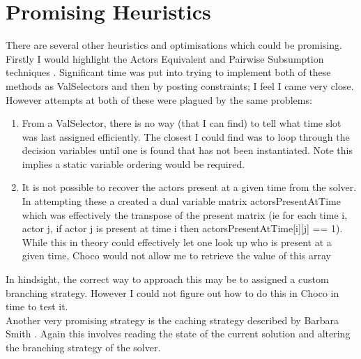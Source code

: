 \documentclass{article}
\begin{document}
\section{Promising Heuristics}
There are several other heuristics and optimisations which could be promising.\\
Firstly I would highlight the Actors Equivalent and Pairwise Subsumption techniques \cite{Informs2011}. Significant time was put into trying to implement both of these methods as ValSelectors and then by posting constraints; I feel I came very close. However attempts at both of these were plagued by the same problems:
\begin{enumerate}
    \item{From a ValSelector, there is no way (that I can find) to tell what time slot was last assigned efficiently. The closest I could find was to loop through the decision variables until one is found that has not been instantiated. Note this implies a static variable ordering would be required.}
    \item{It is not possible to recover the actors present at a given time from the solver. In attempting these a created a dual variable matrix actorsPresentAtTime which was effectively the transpose of the present matrix (ie for each time i, actor j, if actor j is present at time i then actorsPresentAtTime[i][j] == 1). While this in theory could effectively let one look up who is present at a given time, Choco would not allow me to retrieve the value of this array}
\end{enumerate}

In hindsight, the correct way to approach this may be to assigned a custom branching strategy. However I could not figure out how to do this in Choco in time to test it.\\
Another very promising strategy is the caching strategy described by Barbara Smith \cite{Smith2005}. Again this involves reading the state of the current solution and altering the branching strategy of the solver.



\end{document}
